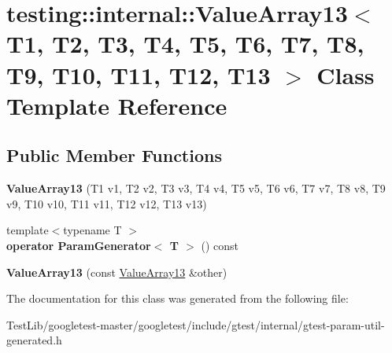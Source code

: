 \hypertarget{classtesting_1_1internal_1_1ValueArray13}{}\section{testing\+:\+:internal\+:\+:Value\+Array13$<$ T1, T2, T3, T4, T5, T6, T7, T8, T9, T10, T11, T12, T13 $>$ Class Template Reference}
\label{classtesting_1_1internal_1_1ValueArray13}
\subsection*{Public Member Functions}
\begin{DoxyCompactItemize}
\item 
\mbox{\label{classtesting_1_1internal_1_1ValueArray13_a57505ac7a4fbb86f4121bf1d41b0352d}} 
{\bfseries Value\+Array13} (T1 v1, T2 v2, T3 v3, T4 v4, T5 v5, T6 v6, T7 v7, T8 v8, T9 v9, T10 v10, T11 v11, T12 v12, T13 v13)
\item 
\mbox{\label{classtesting_1_1internal_1_1ValueArray13_a80572fc9c66a20824ae0934785b41f24}} 
{\footnotesize template$<$typename T $>$ }\\{\bfseries operator Param\+Generator$<$ T $>$} () const
\item 
\mbox{\label{classtesting_1_1internal_1_1ValueArray13_a150575c5629d3a589bf2baba0371b1da}} 
{\bfseries Value\+Array13} (const \hyperlink{classtesting_1_1internal_1_1ValueArray13}{Value\+Array13} \&other)
\end{DoxyCompactItemize}


The documentation for this class was generated from the following file\+:\begin{DoxyCompactItemize}
\item 
Test\+Lib/googletest-\/master/googletest/include/gtest/internal/gtest-\/param-\/util-\/generated.\+h\end{DoxyCompactItemize}
